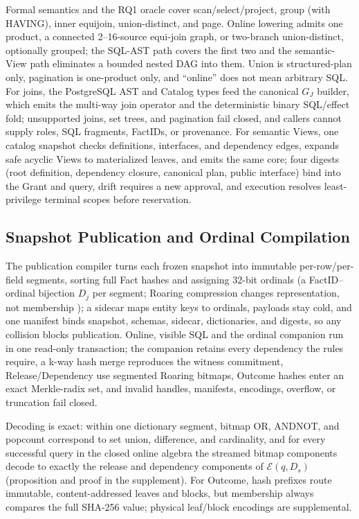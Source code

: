 \documentclass[10pt,journal,compsoc]{IEEEtran}
\newcommand{\code}[1]{\texttt{\detokenize{#1}}}
\newcommand{\effect}{\mathcal{E}}
\begin{document}
Formal semantics and the RQ1 oracle cover scan/select/project, group (with
HAVING), inner equijoin, union-distinct, and page. Online lowering
admits one product, a connected 2--16-source equi-join graph, or two-branch
union-distinct, optionally grouped; the SQL-AST path covers the first two and
the semantic-View path eliminates a bounded nested DAG into them. Union is
structured-plan only, pagination is one-product only, and ``online'' does
not mean arbitrary SQL. For joins, the PostgreSQL AST and Catalog types
feed the canonical $G_J$ builder, which emits the multi-way join operator
and the deterministic binary SQL/effect fold; unsupported joins, set trees,
and pagination fail closed, and callers cannot supply roles, SQL fragments,
FactIDs, or provenance. For semantic Views, one catalog snapshot checks
definitions, interfaces, and dependency edges, expands safe acyclic Views
to materialized leaves, and emits the same core; four digests (root
definition, dependency closure, canonical plan, public interface) bind into
the Grant and query, drift requires a new approval, and execution resolves
least-privilege terminal scopes before reservation.

\subsection{Snapshot Publication and Ordinal Compilation}

The publication compiler turns each frozen snapshot into immutable
per-row/per-field segments, sorting full Fact hashes and assigning 32-bit
ordinals (a FactID--ordinal bijection $D_j$ per segment; Roaring compression
changes representation, not membership \cite{chambi2016roaring}); a sidecar
maps entity keys to ordinals, payloads stay cold, and one manifest binds
snapshot, schemas, sidecar, dictionaries, and digests, so any collision
blocks publication.
Online, visible SQL and the ordinal companion run in one read-only
\code{REPEATABLE READ} transaction; the companion retains every dependency
the rules require, a k-way hash merge reproduces the witness commitment,
Release/Dependency use segmented Roaring bitmaps, Outcome hashes enter an
exact Merkle-radix set, and invalid handles, manifests, encodings, overflow,
or truncation fail closed.

Decoding is exact: within one dictionary segment, bitmap OR, ANDNOT, and
popcount correspond to set union, difference, and cardinality, and for
every successful query in the closed online algebra the streamed bitmap
components decode to exactly the release and dependency components of
$\effect(q,D_s)$ (proposition and proof in the supplement).
For Outcome, hash prefixes route immutable, content-addressed leaves and
blocks, but membership always compares the full SHA-256 value; physical
leaf/block encodings are supplemental.
\end{document}
